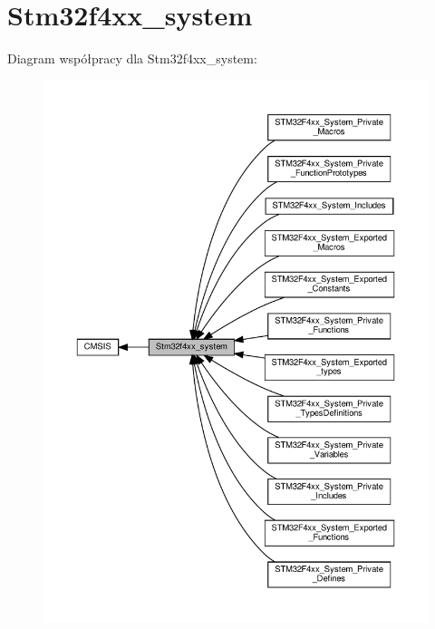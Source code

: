 \hypertarget{group__stm32f4xx__system}{}\section{Stm32f4xx\+\_\+system}
\label{group__stm32f4xx__system}
Diagram współpracy dla Stm32f4xx\+\_\+system\+:\nopagebreak
\begin{figure}[H]
\begin{center}
\leavevmode
\includegraphics[width=350pt]{group__stm32f4xx__system}
\end{center}
\end{figure}
